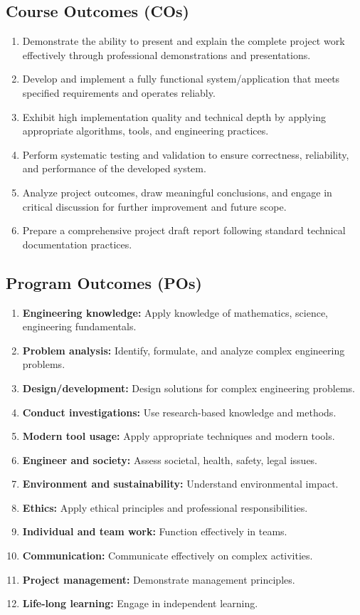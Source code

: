 \documentclass[12pt,letterpaper]{article}
\begin{document}
\subsection*{Course Outcomes (COs)}

\begin{enumerate}[label=\textbf{CO\arabic*:}]
    \item Demonstrate the ability to present and explain the complete project work effectively through professional demonstrations and presentations.
    \item Develop and implement a fully functional system/application that meets specified requirements and operates reliably.
    \item Exhibit high implementation quality and technical depth by applying appropriate algorithms, tools, and engineering practices.
    \item Perform systematic testing and validation to ensure correctness, reliability, and performance of the developed system.
    \item Analyze project outcomes, draw meaningful conclusions, and engage in critical discussion for further improvement and future scope.
    \item Prepare a comprehensive project draft report following standard technical documentation practices.
\end{enumerate}

\subsection*{Program Outcomes (POs)}

\begin{enumerate}[label=\textbf{PO\arabic*:}]
    \item \textbf{Engineering knowledge:} Apply knowledge of mathematics, science, engineering fundamentals.
    \item \textbf{Problem analysis:} Identify, formulate, and analyze complex engineering problems.
    \item \textbf{Design/development:} Design solutions for complex engineering problems.
    \item \textbf{Conduct investigations:} Use research-based knowledge and methods.
    \item \textbf{Modern tool usage:} Apply appropriate techniques and modern tools.
    \item \textbf{Engineer and society:} Assess societal, health, safety, legal issues.
    \item \textbf{Environment and sustainability:} Understand environmental impact.
    \item \textbf{Ethics:} Apply ethical principles and professional responsibilities.
    \item \textbf{Individual and team work:} Function effectively in teams.
    \item \textbf{Communication:} Communicate effectively on complex activities.
    \item \textbf{Project management:} Demonstrate management principles.
    \item \textbf{Life-long learning:} Engage in independent learning.
\end{enumerate}
\end{document}

